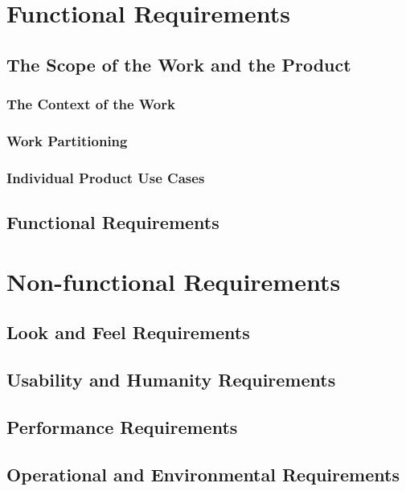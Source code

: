 \documentclass[12pt, titlepage]{article}
\begin{document}
\section{Functional Requirements}

\subsection{The Scope of the Work and the Product}

\subsubsection{The Context of the Work}

\subsubsection{Work Partitioning}

\subsubsection{Individual Product Use Cases}

\subsection{Functional Requirements}

\section{Non-functional Requirements}

\subsection{Look and Feel Requirements}

\subsection{Usability and Humanity Requirements}

\subsection{Performance Requirements}

\subsection{Operational and Environmental Requirements}
\end{document}
